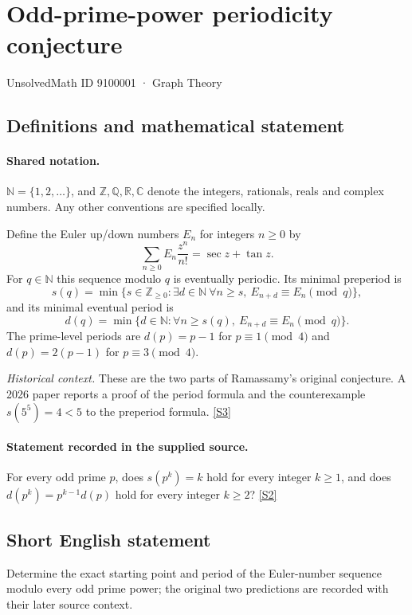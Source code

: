 \documentclass[11pt]{article}
\newcommand{\sref}[2]{\hyperlink{source:#1:#2}{[S#2]}}
\begin{document}
\setcounter{section}{9100000}
\section{Odd-prime-power periodicity conjecture}\label{9100001}
{\small\sffamily UnsolvedMath ID 9100001 · Graph Theory}
\subsection{Definitions and mathematical statement}

\paragraph{Shared notation.}$\mathbb N=\{1,2,\ldots\}$, and $\mathbb Z,\mathbb Q,\mathbb R,\mathbb C$ denote the integers, rationals, reals and complex numbers. Any other conventions are specified locally.


Define the Euler up/down numbers $E_n$ for integers $n\ge0$ by
\[
\sum_{n\ge0} E_n\frac{z^n}{n!}=\sec z+\tan z.
\]
For $q\in\mathbb N$ this sequence modulo $q$ is eventually periodic. Its minimal preperiod is
\[
s(q)=\min\{s\in\mathbb Z_{\ge0}:\exists d\in\mathbb N\ \forall n\ge s,\ E_{n+d}\equiv E_n\pmod q\},
\]
and its minimal eventual period is
\[
d(q)=\min\{d\in\mathbb N:\forall n\ge s(q),\ E_{n+d}\equiv E_n\pmod q\}.
\]
The prime-level periods are $d(p)=p-1$ for $p\equiv1\pmod4$ and $d(p)=2(p-1)$ for $p\equiv3\pmod4$.\par\textit{Historical context.} These are the two parts of Ramassamy's original conjecture. A 2026 paper reports a proof of the period formula and the counterexample $s(5^5)=4<5$ to the preperiod formula. \sref{9100001}{3}
\paragraph{Statement recorded in the supplied source.}
For every odd prime $p$, does $s(p^k)=k$ hold for every integer $k\ge1$, and does $d(p^k)=p^{k-1}d(p)$ hold for every integer $k\ge2$? \sref{9100001}{2}
\subsection{Short English statement}
Determine the exact starting point and period of the Euler-number sequence modulo every odd prime power; the original two predictions are recorded with their later source context.
\end{document}
